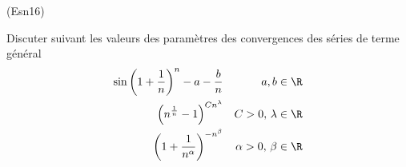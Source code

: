 \begin{tiny}(Esn16)\end{tiny} Discuter suivant les valeurs des paramètres des convergences des séries de terme général
\begin{align*}
  \sin\left( 1+\frac{1}{n}\right)^n - a -\frac{b}{n}& & a , b \in \R \\
  \left(n^{\frac{1}{n}}-1 \right)^{Cn^{\lambda}} & & C >0, \, \lambda \in \R \\
  \left( 1+\frac{1}{n^\alpha}\right)^{-n^\beta} & & \alpha >0, \, \beta \in \R 
\end{align*}
